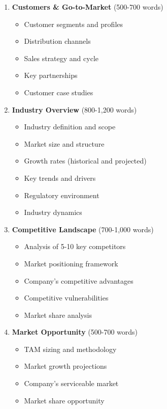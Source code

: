 \documentclass[11pt]{article}
\begin{document}
\begin{enumerate}[leftmargin=*,itemsep=2pt,topsep=2pt]
\begin{itemize}[leftmargin=*,itemsep=2pt,topsep=2pt]
\item {} Target customers and use cases
\item {} Pricing models and typical deal sizes
\end{itemize}
\item {} \textbf{Customers \& Go-to-Market} (500-700 words)
\begin{itemize}[leftmargin=*,itemsep=2pt,topsep=2pt]
\item {} Customer segments and profiles
\item {} Distribution channels
\item {} Sales strategy and cycle
\item {} Key partnerships
\item {} Customer case studies
\end{itemize}
\item {} \textbf{Industry Overview} (800-1,200 words)
\begin{itemize}[leftmargin=*,itemsep=2pt,topsep=2pt]
\item {} Industry definition and scope
\item {} Market size and structure
\item {} Growth rates (historical and projected)
\item {} Key trends and drivers
\item {} Regulatory environment
\item {} Industry dynamics
\end{itemize}
\item {} \textbf{Competitive Landscape} (700-1,000 words)
\begin{itemize}[leftmargin=*,itemsep=2pt,topsep=2pt]
\item {} Analysis of 5-10 key competitors
\item {} Market positioning framework
\item {} Company's competitive advantages
\item {} Competitive vulnerabilities
\item {} Market share analysis
\end{itemize}
\item {} \textbf{Market Opportunity} (500-700 words)
\begin{itemize}[leftmargin=*,itemsep=2pt,topsep=2pt]
\item {} TAM sizing and methodology
\item {} Market growth projections
\item {} Company's serviceable market
\item {} Market share opportunity

\end{itemize}
\end{enumerate}
\end{document}
